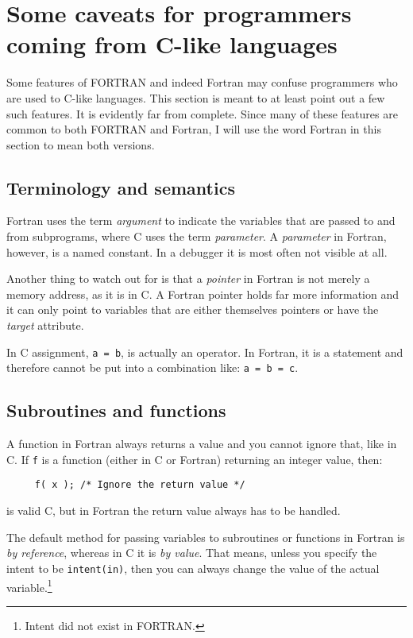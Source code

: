 \section{Some caveats for programmers coming from C-like languages}

Some features of FORTRAN and indeed Fortran may confuse programmers who are used to C-like
languages. This section is meant to at least point out a few such features. It is evidently far
from complete. Since many of these features are common to both FORTRAN and Fortran, I will use the
word Fortran in this section to mean both versions.

\subsection{Terminology and semantics}
Fortran uses the term \emph{argument} to indicate the variables that are passed to and from
subprograms, where C uses the term \emph{parameter}. A \emph{parameter} in Fortran, however,
is a named constant. In a debugger it is most often not visible at all.

Another thing to watch out for is that a \emph{pointer} in Fortran is not merely a memory
address, as it is in C. A Fortran pointer holds far more information and it can only point
to variables that are either themselves pointers or have the \emph{target} attribute.

In C assignment, \verb+a = b+, is actually an operator. In Fortran, it is a statement and
therefore cannot be put into a combination like: \verb+a = b = c+.

\subsection{Subroutines and functions}
A function in Fortran always returns a value and you cannot ignore that, like in C. If \verb+f+
is a function (either in C or Fortran) returning an integer value, then:
\begin{verbatim}
     f( x ); /* Ignore the return value */
\end{verbatim}
\noindent is valid C, but in Fortran the return value always has to be handled.

The default method for passing variables to subroutines or functions in Fortran is \emph{by reference},
whereas in C it is \emph{by value}. That means, unless you specify the intent to be \verb+intent(in)+,
then you can always change the value of the actual variable.\footnote{Intent did not exist in FORTRAN.}


